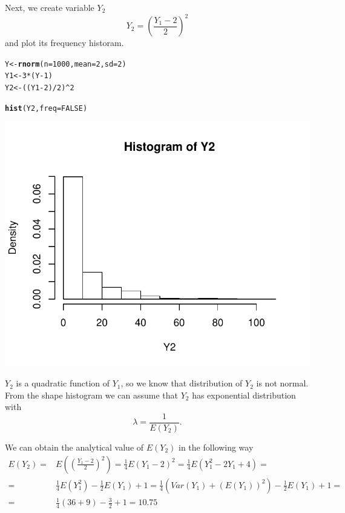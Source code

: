 \documentclass[12pt, a4paper]{article}\usepackage[]{graphicx}\usepackage[]{color}
\makeatletter
\def\maxwidth{ %
  \ifdim\Gin@nat@width>\linewidth
    \linewidth
  \else
    \Gin@nat@width
  \fi
}
\newcommand{\hlnum}[1]{\textcolor[rgb]{0.686,0.059,0.569}{#1}}%
\newcommand{\hlopt}[1]{\textcolor[rgb]{0,0,0}{#1}}%
\newcommand{\hlstd}[1]{\textcolor[rgb]{0.345,0.345,0.345}{#1}}%
\newcommand{\hlkwb}[1]{\textcolor[rgb]{0.69,0.353,0.396}{#1}}%
\newcommand{\hlkwc}[1]{\textcolor[rgb]{0.333,0.667,0.333}{#1}}%
\newcommand{\hlkwd}[1]{\textcolor[rgb]{0.737,0.353,0.396}{\textbf{#1}}}%
\newenvironment{kframe}{%
 \def\at@end@of@kframe{}%
 \ifinner\ifhmode%
  \def\at@end@of@kframe{\end{minipage}}%
  \begin{minipage}{\columnwidth}%
 \fi\fi%
 \def\FrameCommand##1{\hskip\@totalleftmargin \hskip-\fboxsep
 \colorbox{shadecolor}{##1}\hskip-\fboxsep
     \hskip-\linewidth \hskip-\@totalleftmargin \hskip\columnwidth}%
 \MakeFramed {\advance\hsize-\width
   \@totalleftmargin\z@ \linewidth\hsize
   \@setminipage}}%
 {\par\unskip\endMakeFramed%
 \at@end@of@kframe}
\newenvironment{knitrout}{}{} %
\makeatother
\begin{document}
Next, we create variable $Y_2$
\[ Y_2 = \left( \frac{Y_1-2}{2} \right)^2 \]
and plot its frequency historam.
\begin{knitrout}
\color{fgcolor}\begin{kframe}
\begin{alltt}
\hlstd{Y} \hlkwb{<-} \hlkwd{rnorm}\hlstd{(}\hlkwc{n} \hlstd{=} \hlnum{1000}\hlstd{,} \hlkwc{mean} \hlstd{=} \hlnum{2}\hlstd{,} \hlkwc{sd} \hlstd{=} \hlnum{2}\hlstd{)}
\hlstd{Y1} \hlkwb{<-} \hlnum{3} \hlopt{*} \hlstd{(Y} \hlopt{-} \hlnum{1}\hlstd{)}
\hlstd{Y2} \hlkwb{<-} \hlstd{((Y1} \hlopt{-} \hlnum{2}\hlstd{)} \hlopt{/} \hlnum{2}\hlstd{)} \hlopt{^} \hlnum{2}

\hlkwd{hist}\hlstd{(Y2,} \hlkwc{freq} \hlstd{=} \hlnum{FALSE}\hlstd{)}
\end{alltt}
\end{kframe}

{\centering \includegraphics[width=\maxwidth]{figure/ex1_2-1} 

}



\end{knitrout}

$Y_2$ is a quadratic function of $Y_1$, so we know that distribution of $Y_2$ is not normal. From the shape histogram we can assume that $Y_2$ has exponential distribution with 
\[\lambda = \frac{1}{E(Y_2)}.\]

We can obtain the analytical value of $E(Y_2)$ in the following way
\begin{align*}
E(Y_2)=& E(\left( \frac{Y_1-2}{2} \right)^2) = \frac{1}{4} E(Y_1-2)^2 = \frac{1}{4} E(Y_1^2 - 2Y_1 +4) =  \\ 
=& \frac{1}{4} E(Y_1^2) - \frac{1}{2} E(Y_1) + 1= \frac{1}{4}(Var(Y_1)+(E(Y_1))^2)-\frac{1}{2} E(Y_1) + 1 = \\
=& \frac{1}{4} (36 + 9) - \frac{3}{2} + 1 = 10.75
\end{align*}
\end{document}
